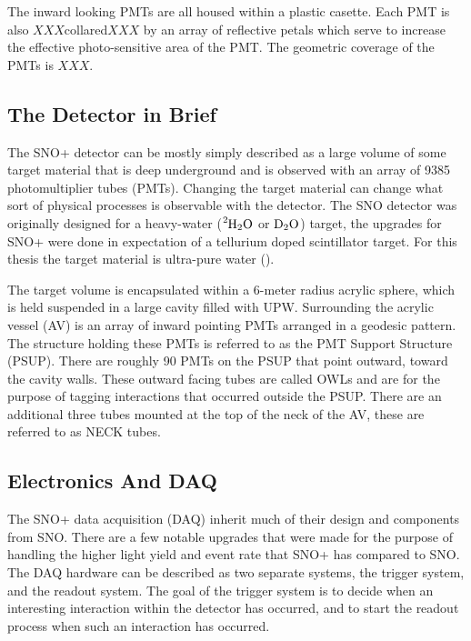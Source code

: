 The inward looking PMTs are all housed within a plastic casette.
Each PMT is also $XXX$collared$XXX$ by an array of reflective
petals which serve to increase the effective photo-sensitive area
of the PMT.
The geometric coverage of the PMTs is $XXX$. %





\subsection{The Detector in Brief}
The SNO+ detector can be mostly simply described as a large volume of some
target material that is deep underground and is observed with an array of
9385  photomultiplier tubes (PMTs).
Changing the target material can change what sort of physical processes is
observable with the detector.
The SNO detector was originally designed for a heavy-water ($\ce{^{2}H_{2}O}$ or $\ce{D_{2}O}$)
target, the upgrades for SNO+ were done in expectation of a tellurium doped
scintillator target.
For this thesis the target material is ultra-pure water ().

The target volume is encapsulated within a 6-meter radius acrylic sphere,
which is held suspended in a large cavity filled with UPW.
Surrounding the acrylic vessel (AV) is an  array of inward pointing PMTs
arranged in a geodesic pattern.
The structure holding these PMTs is referred to as the PMT Support Structure
(PSUP).
There are roughly 90 PMTs on the PSUP that point outward, toward the cavity
walls.
These outward facing tubes are called OWLs and are for the purpose of tagging
interactions that occurred outside the PSUP.
There are an additional three tubes mounted at the top of the neck of the AV,
these are referred to as NECK tubes.

\subsection{Electronics And DAQ}
The SNO+ data acquisition (DAQ) inherit much of their design and components from
SNO.
There are a few notable upgrades that were made for the purpose of handling the
higher light yield and event rate that SNO+ has compared to SNO.
The DAQ hardware can be described as two separate systems, the trigger system,
and the readout system.
The goal of the trigger system is to decide when an interesting interaction
within the detector has occurred, and to start the readout process when such an
interaction has occurred.

